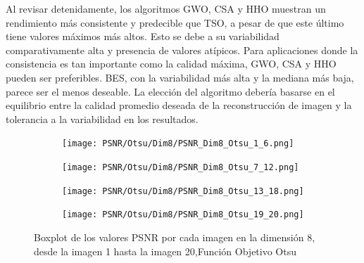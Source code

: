 \documentclass[conference]{IEEEtran}
\begin{document}
\noindent Al revisar detenidamente, los algoritmos GWO, CSA y HHO muestran un rendimiento más consistente y predecible que TSO, a pesar de que este último tiene valores máximos más altos. Esto se debe a su variabilidad comparativamente alta y presencia de valores atípicos. Para aplicaciones donde la consistencia es tan importante como la calidad máxima, GWO, CSA y HHO pueden ser preferibles. BES, con la variabilidad más alta y la mediana más baja, parece ser el menos deseable. La elección del algoritmo debería basarse en el equilibrio entre la calidad promedio deseada de la reconstrucción de imagen y la tolerancia a la variabilidad en los resultados.
\begin{figure}
	\centering
	\begin{subfigure}{0.4\textwidth}
		\texttt{[image: PSNR/Otsu/Dim8/PSNR\_Dim8\_Otsu\_1\_6.png]}
	\end{subfigure}
	
	\begin{subfigure}{0.4\textwidth}
		\texttt{[image: PSNR/Otsu/Dim8/PSNR\_Dim8\_Otsu\_7\_12.png]}
	\end{subfigure}
	\begin{subfigure}{0.4\textwidth}
		\texttt{[image: PSNR/Otsu/Dim8/PSNR\_Dim8\_Otsu\_13\_18.png]}
	\end{subfigure}
	\begin{subfigure}{0.4\textwidth}
		\texttt{[image: PSNR/Otsu/Dim8/PSNR\_Dim8\_Otsu\_19\_20.png]}
		\vspace{-120pt} %
	\end{subfigure}
	\caption{Boxplot de los valores PSNR por cada imagen en la dimensión 8, desde la imagen 1 hasta la imagen 20,Función Objetivo Otsu}
	\label{fig:imagenes}    
\end{figure}
\end{document}
